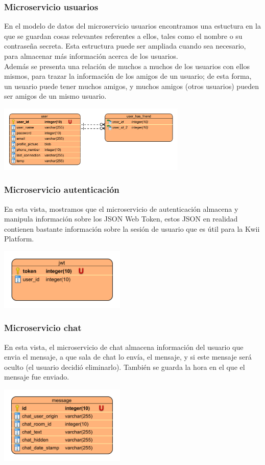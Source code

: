 \subsubsection{Microservicio usuarios}
En el modelo de datos del microservicio usuarios encontramos una estuctura en la que se guardan cosas relevantes referentes a ellos, tales como el nombre o su contraseña secreta. Esta estructura puede ser ampliada cuando sea necesario, para almacenar más información acerca de los usuarios. \\
Además se presenta una relación de muchos a muchos de los usuarios con ellos mismos, para trazar la información de los amigos de un usuario; de esta forma, un usuario puede tener muchos amigos, y muchos amigos (otros usuarios) pueden ser amigos de un mismo usuario.
\begin{center}
    \includegraphics[width=9cm]{Figures/P3/DataModelUsers.png}    
\end{center}
\subsubsection{Microservicio autenticación}
En esta vista, mostramos que el microservicio de autenticación almacena y manipula información sobre los JSON Web Token, estos JSON en realidad contienen bastante información sobre la sesión de usuario que es útil para la Kwii Platform.
\begin{center}
\includegraphics[width=6cm]{Figures/P3/DataModelAuth.png}
\end{center}
\subsubsection{Microservicio chat}
En esta vista, el microservicio de chat almacena información del usuario que envia el mensaje, a que sala de chat lo envía, el mensaje, y si este mensaje será oculto (el usuario decidió eliminarlo). También se guarda la hora en el que el mensaje fue enviado.
\begin{center}
\includegraphics[width=6cm]{Figures/P3/DataModelChat.png}
\end{center}
